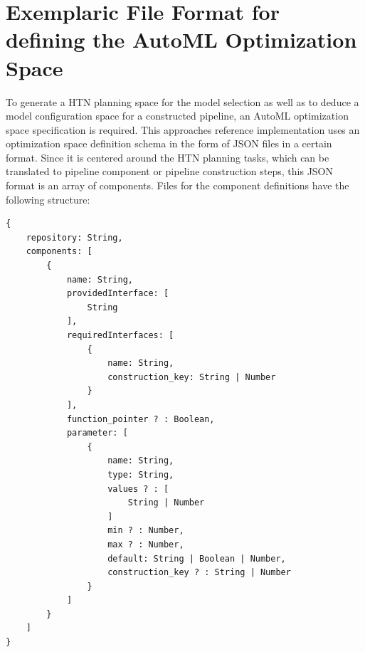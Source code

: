 \section{Exemplaric File Format for defining the AutoML Optimization Space}
\label{sec:implementation:json}
To generate a HTN planning space for the model selection as well as to deduce a model configuration space for a constructed pipeline, an AutoML optimization space specification is required.
This approaches reference implementation uses an optimization space definition schema in the form of JSON files in a certain format.\newline
Since it is centered around the HTN planning tasks, which can be translated to pipeline component or pipeline construction steps, this JSON format is an array of components.
Files for the component definitions have the following structure:
\begin{verbatim}
{
    repository: String,
    components: [
        {
            name: String,
            providedInterface: [
                String
            ],
            requiredInterfaces: [
                {
                    name: String,
                    construction_key: String | Number
                }
            ],
            function_pointer ? : Boolean,
            parameter: [
                {
                    name: String,
                    type: String,
                    values ? : [
                        String | Number
                    ]
                    min ? : Number,
                    max ? : Number,
                    default: String | Boolean | Number,
                    construction_key ? : String | Number
                }
            ]
        }
    ]
}
\end{verbatim}

